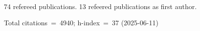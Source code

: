 74 refereed publications. 13 refeered publications as first author.

Total citations~=~4940; h-index~=~37 (2025-06-11)